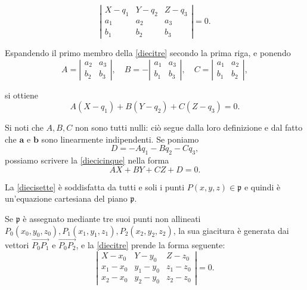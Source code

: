 \documentclass{article}
\theoremstyle{plain}
\theoremstyle{definition}
\theoremstyle{remark}
\begin{document}
\begin{equation}\label{diecitre}
\left|
\begin{array}{ccc}
X - q_1 & Y - q_2 & Z - q_3 \\
a_1 & a_2 & a_3 \\
b_1 & b_2 & b_3
\end{array}
\right| = 0.
\end{equation}

Espandendo il primo membro della \ref{diecitre} secondo la prima riga, e ponendo
\begin{equation}\label{dieciquattro}
A = 
\left|
\begin{array}{cc}
a_2 & a_3 \\
b_2 & b_3
\end{array}
\right|, 
\quad
B = -
\left|
\begin{array}{cc}
a_1 & a_3 \\
b_1 & b_3
\end{array}
\right|, 
\quad
C = 
\left|
\begin{array}{cc}
a_1 & a_2 \\
b_1 & b_2
\end{array}
\right|,
\end{equation}

si ottiene
\begin{equation}\label{diecicinque}
A(X - q_1) + B(Y - q_2) + C(Z - q_3) = 0.
\end{equation}

Si noti che \( A, B, C \) non sono tutti nulli: ciò segue dalla loro definizione e dal fatto che \( \mathbf{a} \) e \( \mathbf{b} \) sono linearmente indipendenti. 
Se poniamo
\begin{equation}\label{diecisei}
D = -Aq_1 - Bq_2 - Cq_3,
\end{equation}
possiamo scrivere la \ref{diecicinque} nella forma
\begin{equation}\label{diecisette}
AX + BY + CZ + D = 0.
\end{equation}

La \ref{diecisette} è soddisfatta da tutti e soli i punti \( P(x, y, z) \in \mathfrak{p} \) e quindi è un'equazione cartesiana del piano \( \mathfrak{p} \).

Se \( \mathfrak{p} \) è assegnato mediante tre suoi punti non allineati 
\( P_0(x_0, y_0, z_0), P_1(x_1, y_1, z_1), P_2(x_2, y_2, z_2) \), la sua giacitura è generata dai vettori \( \overrightarrow{P_0P_1} \) e \( \overrightarrow{P_0P_2} \), 
e la \ref{diecitre} prende la forma seguente:
\begin{equation}\label{dieciotto}
\left|
\begin{array}{ccc}
X - x_0 & Y - y_0 & Z - z_0 \\
x_1 - x_0 & y_1 - y_0 & z_1 - z_0 \\
x_2 - x_0 & y_2 - y_0 & z_2 - z_0
\end{array}
\right| = 0.
\end{equation}
\end{document}
